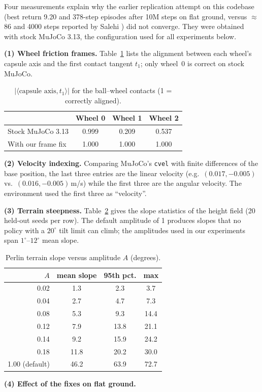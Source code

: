 Four measurements explain why the earlier replication attempt on this codebase (best return 9.20 and 378-step episodes after 10M steps on flat ground, versus $\approx$86 and 4000 steps reported by Salehi \cite{salehi2025}) did not converge. They were obtained with stock MuJoCo 3.13, the configuration used for all experiments below.

\textbf{(1) Wheel friction frames.} Table~\ref{tab:frame} lists the alignment between each wheel's capsule axis and the first contact tangent $t_1$; only wheel~0 is correct on stock MuJoCo.

\begin{table}[h]
\centering\caption{$|\langle \text{capsule axis},t_1\rangle|$ for the ball--wheel contacts (1 = correctly aligned).}\label{tab:frame}
\small\begin{tabular}{lccc}\toprule
 & Wheel 0 & Wheel 1 & Wheel 2\\ \midrule
Stock MuJoCo 3.13 & 0.999 & 0.209 & 0.537\\
With our frame fix & 1.000 & 1.000 & 1.000\\ \bottomrule
\end{tabular}\end{table}

\textbf{(2) Velocity indexing.} Comparing MuJoCo's \texttt{cvel} with finite differences of the base position, the last three entries are the linear velocity (e.g.\ $(0.017,-0.005)$ vs.\ $(0.016,-0.005)$\,m/s) while the first three are the angular velocity. The environment used the first three as ``velocity''.

\textbf{(3) Terrain steepness.} Table~\ref{tab:slope} gives the slope statistics of the height field (20 held-out seeds per row). The default amplitude of 1 produces slopes that no policy with a $20^\circ$ tilt limit can climb; the amplitudes used in our experiments span $1^\circ$--$12^\circ$ mean slope.

\begin{table}[h]
\centering\caption{Perlin terrain slope versus amplitude $A$ (degrees).}\label{tab:slope}
\small\begin{tabular}{rccc}\toprule
$A$ & mean slope & 95th pct. & max\\ \midrule
0.02 & 1.3 & 2.3 & 3.7\\
0.04 & 2.7 & 4.7 & 7.3\\
0.08 & 5.3 & 9.3 & 14.4\\
0.12 & 7.9 & 13.8 & 21.1\\
0.14 & 9.2 & 15.9 & 24.2\\
0.18 & 11.8 & 20.2 & 30.0\\
1.00 (default) & 46.2 & 63.9 & 72.7\\ \bottomrule
\end{tabular}\end{table}

\textbf{(4) Effect of the fixes on flat ground.} 
